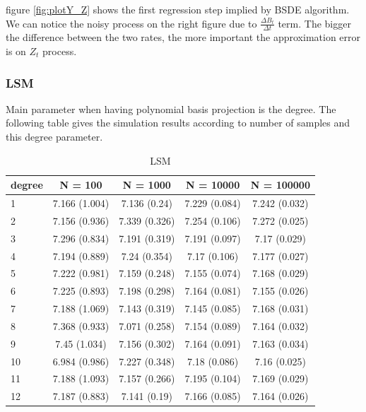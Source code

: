 \documentclass[english,11pt,openany]{report}
\theoremstyle{definition}
\theoremstyle{plain}
\theoremstyle{definition}
\begin{document}
figure \ref*{fig:plotY_Z} shows the first regression step implied by BSDE algorithm. We can notice the noisy process on the right figure due to $\frac{\Delta B_t}{\Delta t}$ term. 
The bigger the difference between the two rates, the more important the approximation error is on $Z_t$ process. 
 
 
 \subsubsection{LSM}

Main parameter when having polynomial basis projection is the degree. The following table gives the simulation results according to number of samples and this degree parameter. 


\begin{table}[H]
	\centering
	\caption{LSM}
	\label{table:lsm}
	\begin{tabular}{|l|c|c|c|c|}
		\hline
		degree & N = 100           & N = 1000          & N = 10000         & N = 100000        \\
		\hline
		1& 7.166 (1.004) & 7.136 (0.24)  & 7.229 (0.084) & 7.242 (0.032) \\ \hline
		2& 7.156 (0.936) & 7.339 (0.326) & 7.254 (0.106) & 7.272 (0.025) \\ \hline
		3& 7.296 (0.834) & 7.191 (0.319) & 7.191 (0.097) & 7.17 (0.029)  \\ \hline
		4& 7.194 (0.889) & 7.24 (0.354)  & 7.17 (0.106)  & 7.177 (0.027) \\ \hline
	5& 	7.222 (0.981) & 7.159 (0.248) & 7.155 (0.074) & 7.168 (0.029) \\ \hline
		6& 7.225 (0.893) & 7.198 (0.298) & 7.164 (0.081) & 7.155 (0.026) \\ \hline
	7& 	7.188 (1.069) & 7.143 (0.319) & 7.145 (0.085) & 7.168 (0.031) \\  \hline
	8& 	7.368 (0.933) & 7.071 (0.258) & 7.154 (0.089) & 7.164 (0.032) \\  \hline 
	9& 	7.45 (1.034)  & 7.156 (0.302) & 7.164 (0.091) & 7.163 (0.034) \\  \hline
	10& 	6.984 (0.986) & 7.227 (0.348) & 7.18 (0.086)  & 7.16 (0.025)  \\  \hline
	11& 	7.188 (1.093) & 7.157 (0.266) & 7.195 (0.104) & 7.169 (0.029) \\  \hline
	12& 	7.187 (0.883) & 7.141 (0.19)  & 7.166 (0.085) & 7.164 (0.026) \\ 
		\hline
		\hline
	\end{tabular}
\end{table}
\end{document}
